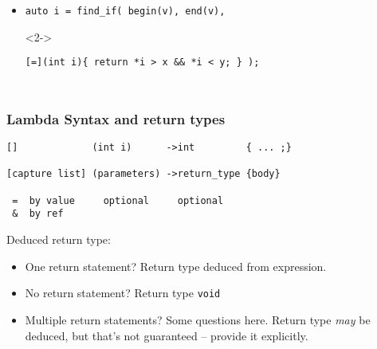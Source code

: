 \begin{frame}[fragile]
\begin{columns}[t]
\pause{}

\hskip 1in 
\vskip 48pt
\begin{itemize}
\item  <2->{\scriptsize\begin{verbatim}auto i = find_if( begin(v), end(v), \end{verbatim}}
\item[]<2->{\scriptsize\begin{verbatim}[=](int i){ return *i > x && *i < y; } );\end{verbatim}}
\end{itemize}

\end{columns}
\end{frame}


\begin{frame}[fragile,t]
\frametitle{Lambda Syntax and return types}

{\scriptsize
\begin{verbatim}
[]             (int i)      ->int         { ... ;}

[capture list] (parameters) ->return_type {body} 

 =  by value     optional     optional
 &  by ref      
\end{verbatim}
}

Deduced return type:
\begin{itemize}
\item One return statement? Return type deduced from expression.
\item No return statement?  Return type \texttt{void}
\item Multiple return statements? Some questions here. Return type \emph{may} be deduced,
  but that's not guaranteed -- provide it explicitly.
\end{itemize}
\end{frame}

